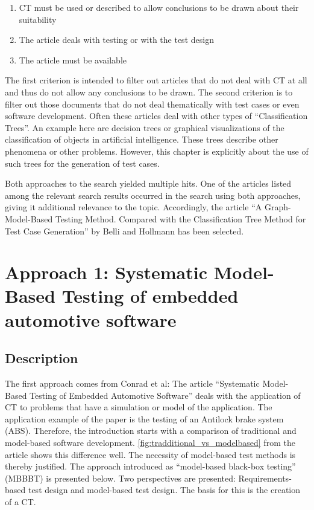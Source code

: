 \begin{enumerate}
\item CT must be used or described to allow conclusions to be drawn about their suitability
\item The article deals with testing or with the test design
\item The article must be available
\end{enumerate}

The first criterion is intended to filter out articles that do not deal with CT at all and thus do not allow any conclusions to be drawn. The second criterion is to filter out those documents that do not deal thematically with test cases or even software development. Often these articles deal with other types of \enquote{Classification Trees}. An example here are decision trees or graphical visualizations of the classification of objects in artificial intelligence. These trees describe other phenomena or  other problems. However, this chapter is explicitly about the use of such trees for the generation of test cases.

Both approaches to the search yielded multiple hits. One of the articles listed among the relevant search results occurred in the search using both approaches, giving it additional relevance to the topic. Accordingly, the article \enquote{A Graph-Model-Based Testing Method. Compared with the Classification Tree Method for Test Case Generation} by Belli and Hollmann\cite{Belli2009} has been selected.

\pagebreak

\section{Approach 1: Systematic Model-Based Testing of embedded automotive software}
\label{Kap:Approach1}

\subsection{Description}

The first approach comes from Conrad et al\cite{Conrad2005}: The article \enquote{Systematic Model-Based Testing of Embedded Automotive Software} deals with the application of CT to problems that have a simulation or model of the application. The application example of the paper is the testing of an Antilock brake system (ABS). Therefore, the introduction starts with a comparison of traditional and model-based software development. \autoref{fig:tradditional_vs_modelbased} from the article shows this difference well. The necessity of model-based test methods is thereby justified. The approach introduced as \enquote{model-based black-box testing} (MBBBT) is presented below. Two perspectives are presented: Requirements-based test design and model-based test design. The basis for this is the creation of a CT.

